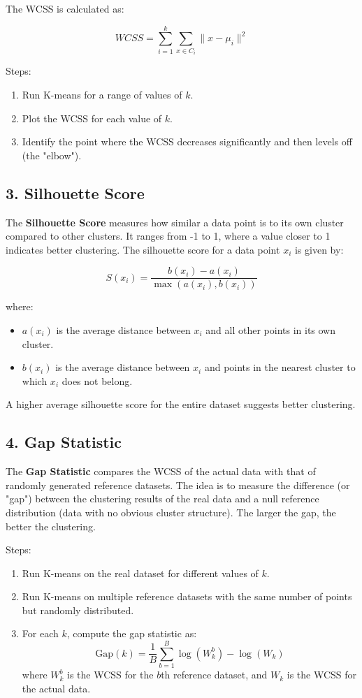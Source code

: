 \documentclass{article}
\begin{document}
The WCSS is calculated as:

\[
WCSS = \sum_{i=1}^{k} \sum_{x \in C_i} \|x - \mu_i\|^2
\]

Steps:
\begin{enumerate}
    \item Run K-means for a range of values of $k$.
    \item Plot the WCSS for each value of $k$.
    \item Identify the point where the WCSS decreases significantly and then levels off (the "elbow").
\end{enumerate}

\subsection{3. Silhouette Score}
The \textbf{Silhouette Score} measures how similar a data point is to its own cluster compared to other clusters. It ranges from -1 to 1, where a value closer to 1 indicates better clustering. The silhouette score for a data point $x_i$ is given by:

\[
S(x_i) = \frac{b(x_i) - a(x_i)}{\max(a(x_i), b(x_i))}
\]

where:
\begin{itemize}
    \item $a(x_i)$ is the average distance between $x_i$ and all other points in its own cluster.
    \item $b(x_i)$ is the average distance between $x_i$ and points in the nearest cluster to which $x_i$ does not belong.
\end{itemize}

A higher average silhouette score for the entire dataset suggests better clustering.

\subsection{4. Gap Statistic}
The \textbf{Gap Statistic} compares the WCSS of the actual data with that of randomly generated reference datasets. The idea is to measure the difference (or "gap") between the clustering results of the real data and a null reference distribution (data with no obvious cluster structure). The larger the gap, the better the clustering.

Steps:
\begin{enumerate}
    \item Run K-means on the real dataset for different values of $k$.
    \item Run K-means on multiple reference datasets with the same number of points but randomly distributed.
    \item For each $k$, compute the gap statistic as:
    \[
    \text{Gap}(k) = \frac{1}{B} \sum_{b=1}^{B} \log(W_k^b) - \log(W_k)
    \]
    where $W_k^b$ is the WCSS for the $b$th reference dataset, and $W_k$ is the WCSS for the actual data.
\end{enumerate}
\end{document}

